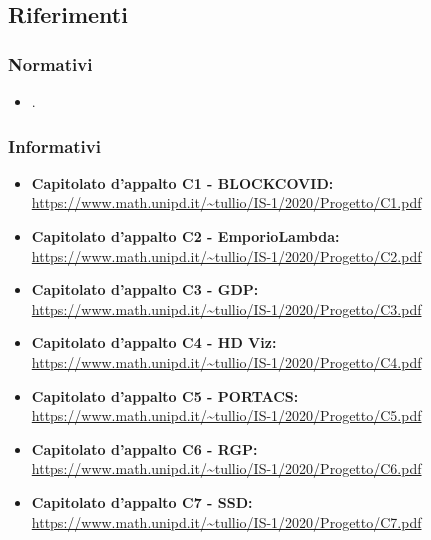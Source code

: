\subsection{Riferimenti}
\subsubsection{Normativi}
\begin{itemize}
\item {}.
\end{itemize}
\subsubsection{Informativi}
\begin{itemize}
\item \textbf {Capitolato d'appalto C1 - BLOCKCOVID:}\\
\url{https://www.math.unipd.it/~tullio/IS-1/2020/Progetto/C1.pdf}
\item \textbf {Capitolato d'appalto C2 - EmporioLambda:}\\
\url{https://www.math.unipd.it/~tullio/IS-1/2020/Progetto/C2.pdf}
\item \textbf {Capitolato d'appalto C3 - GDP:}\\
\url{https://www.math.unipd.it/~tullio/IS-1/2020/Progetto/C3.pdf}
\item \textbf {Capitolato d'appalto C4 - HD Viz:}\\
\url{https://www.math.unipd.it/~tullio/IS-1/2020/Progetto/C4.pdf}
\item \textbf {Capitolato d'appalto C5 - PORTACS:}\\
\url{https://www.math.unipd.it/~tullio/IS-1/2020/Progetto/C5.pdf}
\item \textbf {Capitolato d'appalto C6 - RGP:}\\
\url{https://www.math.unipd.it/~tullio/IS-1/2020/Progetto/C6.pdf}
\item \textbf {Capitolato d'appalto C7 - SSD:}\\
\url{https://www.math.unipd.it/~tullio/IS-1/2020/Progetto/C7.pdf}
\end{itemize}